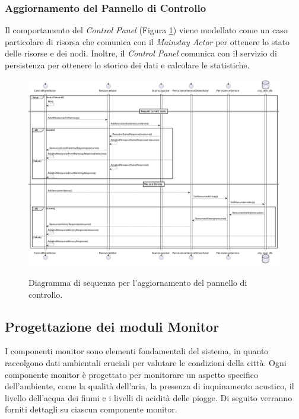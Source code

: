 \documentclass[12pt]{article}
\begin{document}
\subsubsection{Aggiornamento del Pannello di Controllo}

Il comportamento del \textit{Control Panel} (Figura \ref{fig:control-panel-sequence-diagram}) viene modellato come un caso particolare di risorsa che comunica con il \textit{Mainstay Actor} per ottenere lo stato delle risorse e dei nodi. Inoltre, il \textit{Control Panel} comunica con il servizio di persistenza per ottenere lo storico dei dati e calcolare le statistiche.

\begin{figure}[H]
    \caption{Diagramma di sequenza per l'aggiornamento del pannello di controllo.}
    \includegraphics[width=\textwidth]{../assets/images/control-panel-sequence-diagram.png}
    \label{fig:control-panel-sequence-diagram}
\end{figure}

\subsection{Progettazione dei moduli Monitor}
I componenti monitor sono elementi fondamentali del sistema, in quanto raccolgono dati ambientali cruciali per valutare le condizioni della città. Ogni componente monitor è progettato per monitorare un aspetto specifico dell'ambiente, come la qualità dell'aria, la presenza di inquinamento acustico, il livello dell'acqua dei fiumi e i livelli di acidità delle piogge. Di seguito verranno forniti dettagli su ciascun componente monitor.
\end{document}
